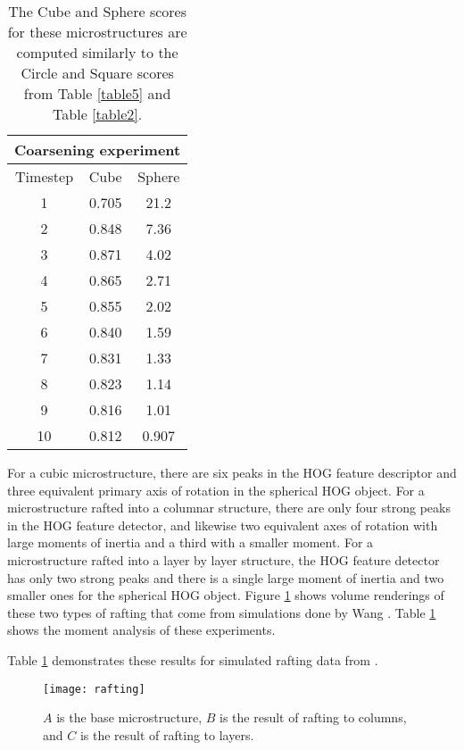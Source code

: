 \documentclass[review]{elsarticle}
\begin{document}
    \begin{table}[h]
      \begin{center}
      \begin{tabular}{ c | c | c }
        \multicolumn{3}{c}{Coarsening experiment} \\
        \hline
        Timestep & Cube & Sphere \\
        \hline
        1 & 0.705 & 21.2 \\
        2 & 0.848 & 7.36 \\
        3 & 0.871 & 4.02 \\
        4 & 0.865 & 2.71 \\
        5 & 0.855 & 2.02 \\
        6 & 0.840 & 1.59 \\
        7 & 0.831 & 1.33 \\
        8 & 0.823 & 1.14 \\
        9 & 0.816 & 1.01 \\
        10 & 0.812 & 0.907 \\
        \hline
      \end{tabular}
	  \caption{ The Cube and Sphere scores for these microstructures are computed similarly to the Circle and Square scores from Table \ref{table5} and Table \ref{table2}. }
	  \label{table3}
	  \end{center}
  	\end{table}

	For a cubic microstructure, there are six peaks in the HOG feature descriptor and three equivalent primary axis of rotation in the spherical HOG object. For a microstructure rafted into a columnar structure, there are only four strong peaks in the HOG feature detector, and likewise two equivalent axes of rotation with large moments of inertia and a third with a smaller moment. For a microstructure rafted into a layer by layer structure, the HOG feature detector has only two strong peaks and there is a single large moment of inertia and two smaller ones for the spherical HOG object. Figure \ref{figure5} shows volume renderings of these two types of rafting that come from simulations done by Wang \cite{ywang2}. Table \ref{table3} shows the moment analysis of these experiments.
	
	Table \ref{table3} demonstrates these results for simulated rafting data from \cite{ywang2}.
	
	\begin{figure}[!ht]
  		\centering
    	\texttt{[image: rafting]}
  		\caption{ $A$ is the base microstructure, $B$ is the result of rafting to columns, and $C$ is the result of rafting to layers. }
  		\label{figure5}
	\end{figure}
	
\end{document}
